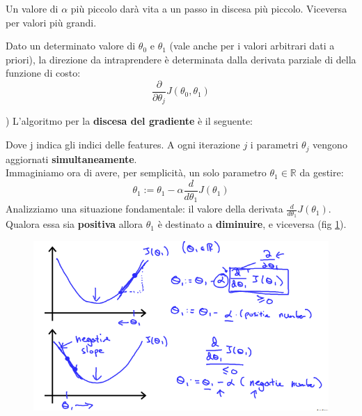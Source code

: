 \begin{definizione}
    Un valore di $\alpha$ più piccolo darà vita a un passo in discesa più piccolo. Viceversa per valori più grandi.
\end{definizione}
\begin{definizione}
Dato un determinato valore di $\theta_0$ e $\theta_1$ (vale anche per i valori arbitrari dati a priori), la direzione da intraprendere è determinata dalla derivata parziale di della funzione di costo:
\[ \frac{\partial}{\partial \theta_j} J(\theta_0, \theta_1)\]
\end{definizione})  
L'algoritmo per la \textbf{discesa del gradiente} è il seguente:
\begin{algorithm}[H]
\begin{algorithmic}
    \EndFor
    \EndWhile
    \end{algorithmic}
\end{algorithm}
Dove j indica gli indici delle features. A ogni iterazione $j$ i parametri $\theta_j$ vengono aggiornati \textbf{simultaneamente}.\\
Immaginiamo ora di avere, per semplicità, un solo parametro $\theta_1 \in \mathbb{R}$ da gestire:
\[\theta_1:=\theta_1-\alpha \frac{d}{d\theta_1} J(\theta_1)\]
Analizziamo una situazione fondamentale: il valore della derivata $\frac{d}{d\theta_1} J(\theta_1)$. Qualora essa sia \textbf{positiva} allora $\theta_1$ è destinato a \textbf{diminuire}, e viceversa (fig \ref{GradientDescent2}).
\begin{figure}[h!]
    \centering
    \includegraphics[width=1\textwidth]{img/SMSIxKGUEeav5QpTGIv-Pg_ad3404010579ac16068105cfdc8e950a_Screenshot-2016-11-03-00.05.06.png}
    \caption{}\label{GradientDescent2}
\end{figure}
